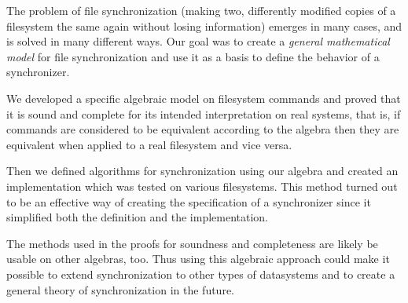 The problem of file synchronization (making two, differently modified
copies of a filesystem the same again without losing information) emerges
in many cases, and is solved in many different ways. Our goal was to
create a \emph{general mathematical model} for file synchronization and
use it as a basis to define the behavior of a synchronizer.

We developed a specific algebraic model on filesystem commands and proved
that it is sound and complete for its intended interpretation on real
systems, that is, if commands are considered to be equivalent according to
the algebra then they are equivalent when applied to a real filesystem and
vice versa.

Then we defined algorithms for synchronization using our algebra and
created an implementation which was tested on various filesystems. This
method turned out to be an effective way of creating the specification of a
synchronizer since it simplified both the definition and the
implementation.

The methods used in the proofs for soundness and completeness are likely
be usable on other algebras, too. Thus using this algebraic approach could make
it possible to extend synchronization to other types of datasystems and
to create a general theory of synchronization in the future.





